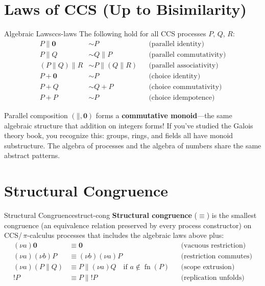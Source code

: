 \documentclass[11pt, a4paper, oneside]{book}
\newcommand{\nil}{\mathbf{0}}
\newcommand{\Par}{\mathbin{\|}}
\newcommand{\res}[1]{(\nu #1)}
\newcommand{\repl}{\mathbin{!}}
\newcommand{\bisim}{\sim}
\newcommand{\fn}{\operatorname{fn}}
\begin{document}
\section{Laws of CCS (Up to Bisimilarity)}

\begin{thm}{Algebraic Laws}{ccs-laws}
The following hold for all CCS processes $P$, $Q$, $R$:
\begin{align}
  P \Par \nil &\bisim P
    &&\text{(parallel identity)} \label{eq:par-unit} \\
  P \Par Q &\bisim Q \Par P
    &&\text{(parallel commutativity)} \label{eq:par-comm} \\
  (P \Par Q) \Par R &\bisim P \Par (Q \Par R)
    &&\text{(parallel associativity)} \label{eq:par-assoc} \\
  P + \nil &\bisim P
    &&\text{(choice identity)} \label{eq:plus-unit} \\
  P + Q &\bisim Q + P
    &&\text{(choice commutativity)} \label{eq:plus-comm} \\
  P + P &\bisim P
    &&\text{(choice idempotence)} \label{eq:plus-idem}
\end{align}
\end{thm}

\begin{intuition}
Parallel composition $(\Par, \nil)$ forms a \textbf{commutative monoid}---the
same algebraic structure that addition on integers forms! If you've studied
the Galois theory book, you recognize this: groups, rings, and fields all have
monoid substructure. The algebra of processes and the algebra of numbers share
the same abstract patterns.
\end{intuition}

\section{Structural Congruence}

\begin{defn}{Structural Congruence}{struct-cong}
\textbf{Structural congruence} ($\equiv$) is the smallest congruence (an
equivalence relation preserved by every process constructor) on
CCS/\,$\pi$-calculus processes that includes the algebraic laws
above plus:
\begin{align}
  \res{a}\nil &\equiv \nil
    &&\text{(vacuous restriction)} \\
  \res{a}\res{b} P &\equiv \res{b}\res{a} P
    &&\text{(restriction commutes)} \\
  \res{a}(P \Par Q) &\equiv P \Par \res{a}Q
    \quad\text{if } a \notin \fn(P)
    &&\text{(scope extrusion)} \\
  \repl P &\equiv P \Par \repl P
    &&\text{(replication unfolds)}
\end{align}
\end{defn}
\end{document}
